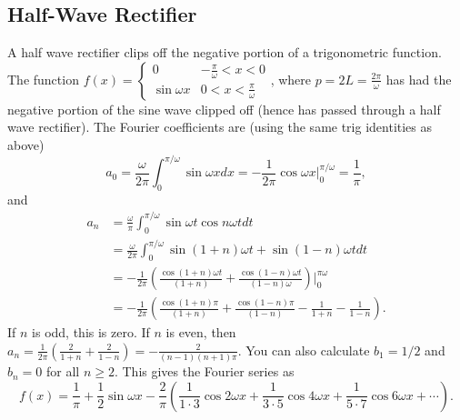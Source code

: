 {\subsection{Half-Wave Rectifier}
A half wave rectifier clips off the negative portion of a trigonometric function. The function $f(x) = \begin{cases}0&-\frac{\pi}{\omega}<x<0\\ \sin\omega x &0< x<\frac{\pi}{\omega}\end{cases}$, where $p = 2L = \frac{2\pi}{\omega}$ has had the negative portion of the sine wave clipped off (hence has passed through a half wave rectifier).  The Fourier coefficients are (using the same trig identities as above) 
$$a_0=\frac{\omega}{2\pi}\int_0^{\pi/\omega}\sin\omega x dx = -\frac{1}{2\pi}\cos\omega x \big|_0^{\pi/\omega} = \frac{1}{\pi},$$ and 
\begin{align*}
a_n 
&= \frac{\omega}{\pi}\int_{0}^{\pi/\omega}\sin \omega t \cos n\omega tdt \\
&= \frac{\omega}{2\pi}\int_{0}^{\pi/\omega}\sin(1+n)\omega t+ \sin(1-n)\omega t dt \\
&= -\frac{1}{2\pi}\left(\frac{\cos(1+n)\omega t}{(1+n)}+ \frac{\cos(1-n)\omega t}{(1-n)\omega} \right)\big|_{0}^{\pi\omega} \\
&= -\frac{1}{2\pi}\left(\frac{\cos(1+n)\pi}{(1+n)}+ \frac{\cos(1-n)\pi}{(1-n)}  - \frac{1}{1+n}-\frac{1}{1-n}\right). 
\end{align*}
If $n$ is odd, this is zero.  If $n$ is even, then $a_n = \frac{1}{2\pi}\left( \frac{2}{1+n}+\frac{2}{1-n}\right) = -\frac{2}{(n-1)(n+1)\pi}$.  You can also calculate $b_1=1/2$ and $b_n=0$ for all $n\geq 2$.  This gives the Fourier series as
$$f(x) = \frac{1}{\pi}+\frac{1}{2}\sin\omega x  - \frac{2}{\pi}\left(\frac{1}{1\cdot 3}\cos 2\omega x + \frac{1}{3\cdot 5}\cos 4\omega x +\frac{1}{5\cdot 7}\cos 6\omega x +\cdots \right).$$



}
